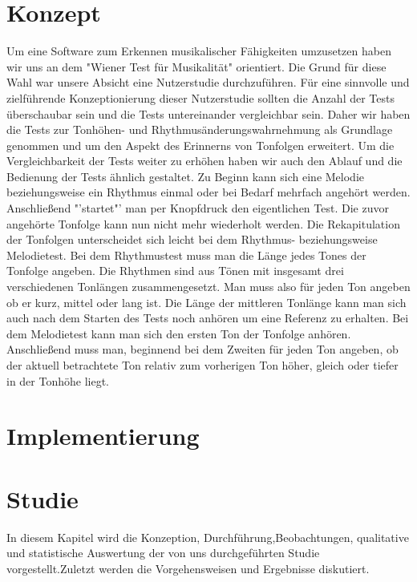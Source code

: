 \documentclass{acm_proc_article-sp}
\begin{document}
\section{Konzept}
Um eine Software zum Erkennen musikalischer Fähigkeiten umzusetzen haben wir uns an dem "Wiener Test für Musikalität" orientiert.
Die Grund für diese Wahl war unsere Absicht eine Nutzerstudie durchzuführen. Für eine sinnvolle und zielführende Konzeptionierung dieser Nutzerstudie sollten die Anzahl der Tests überschaubar sein und die Tests untereinander vergleichbar sein.
Daher wir haben die Tests zur Tonhöhen- und Rhythmusänderungswahrnehmung als Grundlage genommen und um den Aspekt des Erinnerns von Tonfolgen erweitert.
Um die Vergleichbarkeit der Tests weiter zu erhöhen haben wir auch den Ablauf und die Bedienung der Tests ähnlich gestaltet.
Zu Beginn kann sich eine Melodie beziehungsweise ein Rhythmus einmal oder bei Bedarf mehrfach angehört werden. Anschließend "'startet"' man per Knopfdruck den eigentlichen Test. Die zuvor angehörte Tonfolge kann nun nicht mehr wiederholt werden. Die Rekapitulation der Tonfolgen unterscheidet sich leicht bei dem Rhythmus- beziehungsweise Melodietest. Bei dem Rhythmustest muss man die Länge jedes Tones der Tonfolge angeben. Die Rhythmen sind aus Tönen mit insgesamt drei verschiedenen Tonlängen zusammengesetzt. Man muss also für jeden Ton angeben ob er kurz, mittel oder lang ist. Die Länge der mittleren Tonlänge kann man sich auch nach dem Starten des Tests noch anhören um eine Referenz zu erhalten.
Bei dem Melodietest kann man sich den ersten Ton der Tonfolge anhören. Anschließend muss man, beginnend bei dem Zweiten für jeden Ton angeben, ob der aktuell betrachtete Ton relativ zum vorherigen Ton höher, gleich oder tiefer in der Tonhöhe liegt.

\section{Implementierung}

\section{Studie}
In diesem Kapitel wird die Konzeption, Durchführung,Beobachtungen, qualitative und statistische Auswertung der von uns durchgeführten Studie vorgestellt.Zuletzt werden die Vorgehensweisen und Ergebnisse diskutiert.
\end{document}
